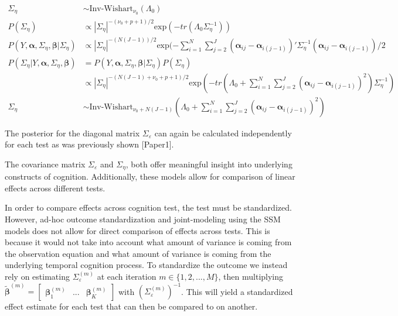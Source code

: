 \documentclass[
]{article}
\begin{document}
\begin{equation*}
\begin{aligned}
\Sigma_\eta &\sim \text{Inv-Wishart}_{\nu_0}(\Lambda_0)\\
P(\Sigma_\eta) &\propto |\Sigma_\eta|^{-(\nu_0+p+1)/2}\text{exp}(-tr(\Lambda_0\Sigma_\eta^{-1}))\\
P(Y, \boldsymbol{\alpha}, \Sigma_\eta, \boldsymbol{\beta}|\Sigma_\eta) &\propto |\Sigma_\eta|^{-(N(J-1))/2}\text{exp}(-\sum^N_{i = 1}\sum^{J}_{j= 2} (\boldsymbol{\alpha}_{ij} - \boldsymbol{\alpha}_{i(j-1)})'\Sigma_\eta^{-1}(\boldsymbol{\alpha}_{ij} - \boldsymbol{\alpha}_{i(j-1)})/2 \\
P(\Sigma_\eta|Y, \boldsymbol{\alpha}, \Sigma_\eta, \boldsymbol{\beta}) & = P(Y, \boldsymbol{\alpha}, \Sigma_\eta, \boldsymbol{\beta}|\Sigma_\eta)P(\Sigma_\eta) \\ &\propto |\Sigma_\eta|^{-(N(J-1) +\nu_0+p+1)/2}\text{exp}(-tr(\Lambda_0 + \sum^N_{i = 1}\sum^J_{j= 2} (\boldsymbol{\alpha}_{ij} - \boldsymbol{\alpha}_{i(j-1)})^2)\Sigma_\eta^{-1})\\
\Sigma_\eta & \sim \text{Inv-Wishart}_{\nu_0 + N(J-1)}(\Lambda_0+\sum^N_{i = 1}\sum^J_{j= 2} (\boldsymbol{\alpha}_{ij} - \boldsymbol{\alpha}_{i(j-1)})^2)
\end{aligned}
\end{equation*}

The posterior for the diagonal matrix \(\Sigma_\varepsilon\) can again be calculated independently for each test as was previously shown {[}Paper1{]}.

The covariance matrix \(\Sigma_\varepsilon\) and \(\Sigma_\eta\), both offer meaningful insight into underlying constructs of cognition. Additionally, these models allow for comparison of linear effects across different tests.

In order to compare effects across cognition test, the test must be standardized. However, ad-hoc outcome standardization and joint-modeling using the SSM models does not allow for direct comparison of effects across tests. This is because it would not take into account what amount of variance is coming from the observation equation and what amount of variance is coming from the underlying temporal cognition process. To standardize the outcome we instead rely on estimating \(\Sigma_\varepsilon^{(m)}\) at each iteration \(m \in \{1, 2, ..., M\}\), then multiplying \(\tilde{\boldsymbol{\beta}}^{(m)} = \begin{bmatrix}\boldsymbol{\beta}_1^{(m)} & ... & \boldsymbol{\beta}_K^{(m)}\end{bmatrix}\) with \((\Sigma_\varepsilon^{(m)})^{-1}\). This will yield a standardized effect estimate for each test that can then be compared to on another.
\end{document}
